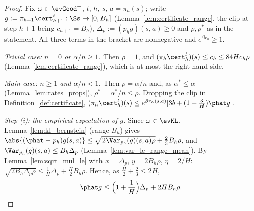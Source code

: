 \begin{proof}
\leanok
Fix $\omega \in \evGood^+$, $t$, $h$, $s$, $a = \pi_h(s)$; write $g := \pi_{h+1}\cert^t_{h+1} : \Ss \to [0, B_h]$
(Lemma~\ref{lem:certificate_range}, the clip at step $h + 1$ being $c_{h+1} = B_h$),
$\Delta_p := (p_h g)(s,a) \ge 0$ and $\rho, \rho^*$ as in the statement. All three terms in the
bracket are nonnegative and $e^{\beta r_h} \ge 1$.

\emph{Trivial case: $n = 0$ or $\alpha/n \ge 1$.} Then $\rho = 1$, and $(\pi_h\cert_h^t)(s) \le c_h \le 84 H c_h \rho$
(Lemma~\ref{lem:certificate_range}), which is at most the right-hand side.

\emph{Main case: $n \ge 1$ and $\alpha/n < 1$.} Then $\rho = \alpha/n$ and, as $\alpha^* \le \alpha$
(Lemma~\ref{lem:rates_props}), $\rho^* = \alpha^*/n \le \rho$. Dropping the clip in
Definition~\ref{def:certificate}, $(\pi_h\cert_h^t)(s) \le e^{\beta r_h(s,a)}[3b + (1 + \frac3H)\phat g]$.

\emph{Step (i): the empirical expectation of $g$.} Since $\omega \in \evKL$,
Lemma~\ref{lem:kl_bernstein} (range $B_h$) gives
$\abs{(\phat - p_h) g(s,a)} \le \sqrt{2\Var_{p_h}(g)(s,a)\rho} + \frac23 B_h\rho$, and
$\Var_{p_h}(g)(s,a) \le B_h\Delta_p$ (Lemma~\ref{lem:var_le_range_mean}). By
Lemma~\ref{lem:sqrt_mul_le} with $x = \Delta_p$, $y = 2B_h\rho$, $\eta = 2/H$:
$\sqrt{2B_h\Delta_p\rho} \le \frac1H\Delta_p + \frac{H}{2}B_h\rho$. Hence, as $\frac H2 + \frac23 \le 2H$,
\[
  \phat g \le \Big(1 + \frac1H\Big)\Delta_p + 2 H B_h \rho .
\]


\end{proof}
